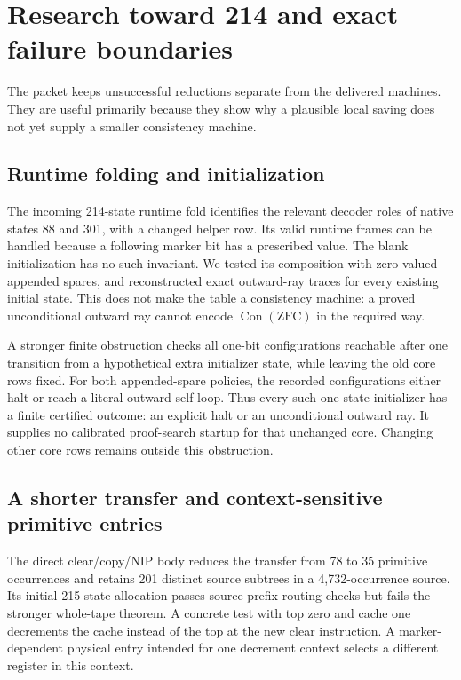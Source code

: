 \documentclass[11pt]{article}
\newcommand{\ZFC}{\mathrm{ZFC}}
\newcommand{\Con}{\operatorname{Con}}
\begin{document}


\section{Research toward 214 and exact failure boundaries}
\label{sec:research}

The packet keeps unsuccessful reductions separate from the delivered machines. They are useful primarily because they show why a plausible local saving does not yet supply a smaller consistency machine.

\subsection{Runtime folding and initialization}

The incoming 214-state runtime fold identifies the relevant decoder roles of native states 88 and 301, with a changed helper row. Its valid runtime frames can be handled because a following marker bit has a prescribed value. The blank initialization has no such invariant. We tested its composition with zero-valued appended spares, and reconstructed exact outward-ray traces for every existing initial state. This does not make the table a consistency machine: a proved unconditional outward ray cannot encode $\Con(\ZFC)$ in the required way.

A stronger finite obstruction checks all one-bit configurations reachable after one transition from a hypothetical extra initializer state, while leaving the old core rows fixed. For both appended-spare policies, the recorded configurations either halt or reach a literal outward self-loop. Thus every such one-state initializer has a finite certified outcome: an explicit halt or an unconditional outward ray. It supplies no calibrated proof-search startup for that unchanged core. Changing other core rows remains outside this obstruction.

\subsection{A shorter transfer and context-sensitive primitive entries}

The direct clear/copy/NIP body reduces the transfer from 78 to 35 primitive occurrences and retains 201 distinct source subtrees in a 4,732-occurrence source. Its initial 215-state allocation passes source-prefix routing checks but fails the stronger whole-tape theorem. A concrete test with top zero and cache one decrements the cache instead of the top at the new clear instruction. A marker-dependent physical entry intended for one decrement context selects a different register in this context.
\end{document}
